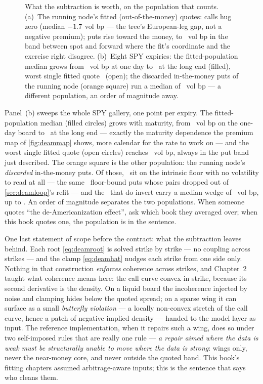 \begin{figure}[htbp]
\centering
{}
\caption{What the subtraction is worth, on the population that
counts.  (a)~The running node's fitted (out-of-the-money) quotes:
calls hug zero (median $-1.7$ vol bp --- the
tree's European-leg gap, not a negative premium); puts rise toward
the money, to \MacDeamGalSelMaxBp\ vol bp in the band between spot
and forward where the fit's coordinate and the exercise right
disagree.  (b)~Eight SPY expiries: the fitted-population median
grows from \MacDeamGalShortMedianBp\ vol bp at one day to
\MacDeamGalWorstMedianBp\ at the long end (filled), worst single
fitted quote \MacDeamGalWorstMaxBp\ (open); the discarded
in-the-money puts of the running node (orange square) run a median
of \MacDeamGalItmMedianBp\ vol bp --- a different population, an
order of magnitude away.}
\label{fig:deamgallery}
\end{figure}

Panel~(b) sweeps the whole SPY gallery, one point per expiry.  The
fitted-population median (filled circles) grows with maturity, from
\MacDeamGalShortMedianBp\ vol bp on the one-day board to
\MacDeamGalWorstMedianBp\ at the long end --- exactly the maturity
dependence the premium map of \cref{fig:deammap} shows, more
calendar for the rate to work on --- and the worst single fitted
quote (open circles) reaches \MacDeamGalWorstMaxBp\ vol bp, always
in the put band just described.  The orange square is the other
population: the running node's \emph{discarded} in-the-money puts.
Of those, \MacDeamGalItmDead\ sit on the intrinsic floor with no
volatility to read at all --- the same \MacDeamGalItmDead\
floor-bound puts whose pairs dropped out of \cref{sec:deamloop}'s
refit --- and
the \MacDeamGalItmN\ that do invert carry a median wedge of
\MacDeamGalItmMedianBp\ vol bp, up to \MacDeamGalItmMaxBp.  An order
of magnitude separates the two populations.  When someone quotes
``the de-Americanization effect'', ask which book they averaged
over; when this book quotes one, the population is in the sentence.

One last statement of scope before the contract: what the subtraction
leaves behind.  Each root \eqref{eq:deamroot} is solved strike by
strike --- no coupling across strikes --- and the clamp
\eqref{eq:deamhat} nudges each strike from one side only.  Nothing in
that construction \emph{enforces} coherence across strikes, and
Chapter~2 taught what coherence means here: the call curve convex in
strike, because its second derivative is the density.  On a liquid
board the incoherence injected by noise and clamping hides below the
quoted spread; on a sparse wing it can surface as a small
\emph{butterfly violation} --- a locally non-convex stretch of the
call curve, hence a patch of negative implied density --- handed to
the model layer as input.  The reference
implementation, when it repairs such a wing, does so under two
self-imposed rules that are really one rule --- \emph{a repair aimed
where the data is weak must be structurally unable to move where the
data is strong}: wings only, never the near-money core, and never
outside the quoted band.  This book's fitting chapters assumed
arbitrage-aware inputs; this is the sentence that says who cleans
them.

